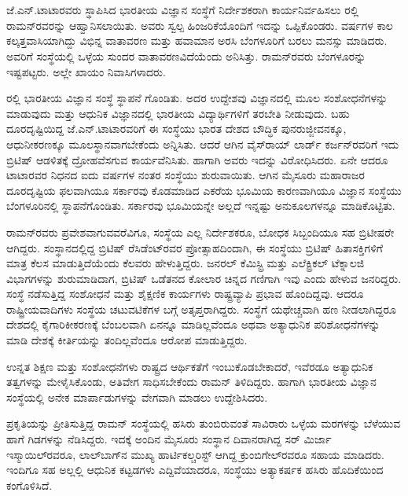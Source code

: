 
\chapter{}


ಜೆ.ಎನ್.ಟಾಟಾರವರು ಸ್ಥಾಪಿಸಿದ ಭಾರತೀಯ ವಿಜ್ಞಾನ ಸಂಸ್ಥೆಗೆ ನಿರ್ದೇಶಕರಾಗಿ ಕಾರ್ಯನಿರ್ವಹಿಸಲು ರಲ್ಲಿ ರಾಮನ್‍ರವರನ್ನು ಆಹ್ವಾನಿಸಲಾಯಿತು. ಅವರು ಸ್ವಲ್ಪ ಹಿಂಜರಿಕೆಯೊಂದಿಗೆ ಇದನ್ನು ಒಪ್ಪಿಕೊಂಡರು.  ವರ್ಷಗಳ ಕಾಲ ಕಲ್ಕತ್ತವಾಸಿಯಾಗಿದ್ದು ವಿಭಿನ್ನ ವಾತಾವರಣ ಮತ್ತು ಹವಾಮಾನ ಅರಸಿ ಬೆಂಗಳೂರಿಗೆ ಬರಲು ಮನಸ್ಸು ಮಾಡಿದರು. ಅವರಿಗೆ ಸಂಸ್ಥೆಯಲ್ಲಿ ಒಳ್ಳೆಯ ಸುಂದರ ವಾತಾವರಣವಿದೆಯೆಂದು ಅನಿಸಿತ್ತು. ರಾಮನ್‍ರವರು ಬೆಂಗಳೂರನ್ನು ಇಷ್ಟಪಟ್ಟರು. ಅಲ್ಲೇ ಖಾಯಂ ನಿವಾಸಿಗಳಾದರು.

ರಲ್ಲಿ ಭಾರತೀಯ ವಿಜ್ಞಾನ ಸಂಸ್ಥೆ ಸ್ಥಾಪನೆ ಗೊಂಡಿತು. ಅದರ ಉದ್ದೇಶವು ವಿಜ್ಞಾನದಲ್ಲಿ ಮೂಲ ಸಂಶೋಧನೆಗಳನ್ನು ಮಾಡುವುದು ಮತ್ತು ಆಧುನಿಕ ವಿಜ್ಞಾನದಲ್ಲಿ ಭಾರತೀಯ ವಿದ್ಯಾರ್ಥಿಗಳಿಗೆ ತರಬೇತಿ ನೀಡುವುದು. ಬಹು ದೂರದೃಷ್ಟಿಯಿದ್ದ ಜೆ.ಎನ್.ಟಾಟಾರವರಿಗೆ ಈ ಸಂಸ್ಥೆಯು ಭಾರತ ದೇಶದ ಬೌದ್ಧಿಕ ಪುನರುಜ್ಜೀವನಕ್ಕೂ, ಆಧುನೀಕರಣಕ್ಕೂ ಮೂಲಸ್ಥಾನವಾಗಬೇಕೆಂದು ಅನ್ನಿಸಿತು. ಆದರೆ ಆಗಿನ ವೈಸ್‍ರಾಯ್ ಲಾರ್ಡ್ ಕರ್ಜನ್‍ರವರಿಗೆ ಇದು ಬ್ರಿಟಿಷ್ ಆಡಳಿತಕ್ಕೆ ದ್ರೋಹವೆಸಗುವ ಕಾರ್ಯವೆನಿಸಿತು. ಹಾಗಾಗಿ ಅವರು ಇದನ್ನು ವಿರೋಧಿಸಿದರು. ಏನೇ ಆದರೂ ಟಾಟಾರವರ ನಿಧನದ ಐದು ವರ್ಷಗಳ ನಂತರ ಸಂಸ್ಥೆಯು ಶುರುವಾಯಿತು. ಆಗಿನ ಮೈಸೂರು ಮಹಾರಾಜರ ದೂರದೃಷ್ಟಿಯ ಫಲವಾಗಿಯೂ ಸರ್ಕಾರವು ಕೊಡಮಾಡಿದ  ಎಕರೆಯ ಭೂಮಿಯ ಕಾರಣವಾಗಿಯೂ ವಿಜ್ಞಾನ ಸಂಸ್ಥೆಯು ಬೆಂಗಳೂರಿನಲ್ಲಿ ಸ್ಥಾಪನೆಗೊಂಡಿತು. ಸರ್ಕಾರವು ಭೂಮಿಯನ್ನೇ ಅಲ್ಲದೆ ಇನ್ನಷ್ಟು ಅನುಕೂಲಗಳನ್ನೂ ಮಾಡಿಕೊಟ್ಟಿತು.

ರಾಮನ್‍ರವರು ಪ್ರವೇಶವಾಗುವವರೆವಿಗೂ, ಸಂಸ್ಥೆಯ ಎಲ್ಲ ನಿರ್ದೇಶಕರೂ, ಬೋಧಕ ಸಿಬ್ಬಂದಿಯೂ ಸಹ ಬ್ರಿಟೀಷರೇ ಆಗಿದ್ದರು. ಸಂಸ್ಥಾನದಲ್ಲಿದ್ದ ಬ್ರಿಟಿಷ್ ರೆಸಿಡೆಂಟ್‍ರವರ ಪ್ರೋತ್ಸಾಹದಿಂದಾಗಿ, ಈ ಸಂಸ್ಥೆಯು ಬ್ರಿಟಿಷ್ ಹಿತಾಸಕ್ತಿಗಳಿಗೆ ಮಾತ್ರ ಕೆಲಸ ಮಾಡುತ್ತಿದೆಯೆಂದು ಕೆಲವರು ಹೇಳುತ್ತಿದ್ದರು. ಜನರಲ್ ಕೆಮಿಸ್ಟ್ರಿ ಮತ್ತು ಎಲೆಕ್ಟ್ರಿಕಲ್ ಟೆಕ್ನಾಲಜಿ ವಿಭಾಗಗಳನ್ನು ಶುರುಮಾಡಿದಾಗ, ಬ್ರಿಟಿಷ್ ಒಡೆತನದ ಕೋಲಾರ ಚಿನ್ನದ ಗಣಿಗಾಗಿ ಇವು ಎಂದು ಹೇಳುವ ಜನರಿದ್ದರು. ಸಂಸ್ಥೆ ನಡೆಸುತ್ತಿದ್ದ ಸಂಶೋಧನೆ ಮತ್ತು ಶೈಕ್ಷಣಿಕ ಕಾರ್ಯಗಳು ರಾಷ್ಟ್ರವ್ಯಾಪಿ ಪ್ರಭಾವ ಹೊಂದಿದ್ದವು. ಆದರೂ ರಾಷ್ಟ್ರೀಯವಾದಿಗಳು ಸಂಸ್ಥೆಯ ಚಟುವಟಿಕೆಗಳ ಬಗ್ಗೆ ಅತೃಪ್ತರಾಗಿದ್ದರು. ಸಂಸ್ಥೆಗೆ ಯಥೇಚ್ಚವಾಗಿ ಹಣ ನೀಡಲಾಗಿದ್ದರೂ ದೇಶದಲ್ಲಿ ಕೈಗಾರಿಕೀಕರಣಕ್ಕೆ ಬೆಂಬಲವಾಗಿ ಏನನ್ನೂ ಮಾಡಿಲ್ಲವೆಂದೂ ಅಥವಾ ಅತ್ಯಾಧುನಿಕ ಪರಿಶೋಧನೆಗಳನ್ನು ಮಾಡಿ ದೇಶಕ್ಕೆ ಕೀರ್ತಿಯನ್ನು ತಂದಿಲ್ಲವೆಂದೂ ಆರೋಪ ಮಾಡುತ್ತಿದ್ದರು.

ಉನ್ನತ ಶಿಕ್ಷಣ ಮತ್ತು ಸಂಶೋಧನೆಗಳು ರಾಷ್ಟ್ರದ ಆರ್ಥಿಕತೆಗೆ ಇಂಬುಕೊಡಬೇಕಾದರೆ, ಇವೆರಡೂ ಅತ್ಯಾಧುನಿಕ ತತ್ವಗಳನ್ನು ಮೇಳೈಸಿಕೊಂಡು, ಅತಿವೇಗ ಸಾಧಿಸಬೇಕೆಂದು ರಾಮನ್ ತಿಳಿದಿದ್ದರು. ಹಾಗಾಗಿ ಭಾರತೀಯ ವಿಜ್ಞಾನ ಸಂಸ್ಥೆಯಲ್ಲಿ ಅನೇಕ ಮಾರ್ಪಾಡುಗಳನ್ನು ವೇಗವಾಗಿ ಮಾಡಲು ಉದ್ದೇಶಿಸಿದರು.

ಪ್ರಕೃತಿಯನ್ನು ಪ್ರೀತಿಸುತ್ತಿದ್ದ ರಾಮನ್ ಸಂಸ್ಥೆಯಲ್ಲಿ ಹಸಿರು ತುಂಬಿರುವಂತೆ ಸಾವಿರಾರು ಒಳ್ಳೆಯ ಮರಗಳನ್ನು ಬೆಳೆಯುವ ಹಾಗೆ ಗಿಡಗಳನ್ನು ನೆಡಿಸಿದ್ದರು. ಇದಕ್ಕೆ ಅಂದಿನ ಮೈಸೂರು ಸಂಸ್ಥಾನ ದಿವಾನರಾಗಿದ್ದ ಸರ್ ಮಿರ್ಜಾ ಇಸ್ಮಾಯಿಲ್‍ರವರೂ, ಲಾಲ್‍ಬಾಗ್‍ನ ಮುಖ್ಯ ಹಾರ್ಟಿಕಲ್ಚರಿಸ್ಟ್ ಆಗಿದ್ದ ಕ್ರುಂಬಿಗೇಲ್‍ರವರೂ ಸಹಾಯ ಮಾಡಿದರು. ಇಂದಿಗೂ ಸಹ ಅಲ್ಲಲ್ಲಿ ಆಧುನಿಕ ಕಟ್ಟಡಗಳು ಎದ್ದಿವೆಯಾದರೂ, ಸಂಸ್ಥೆಯು ಅತ್ಯಾಕರ್ಷಕ ಹಸಿರು ಹೊದಿಕೆಯಿಂದ ಕಂಗೊಳಿಸಿದೆ. 

